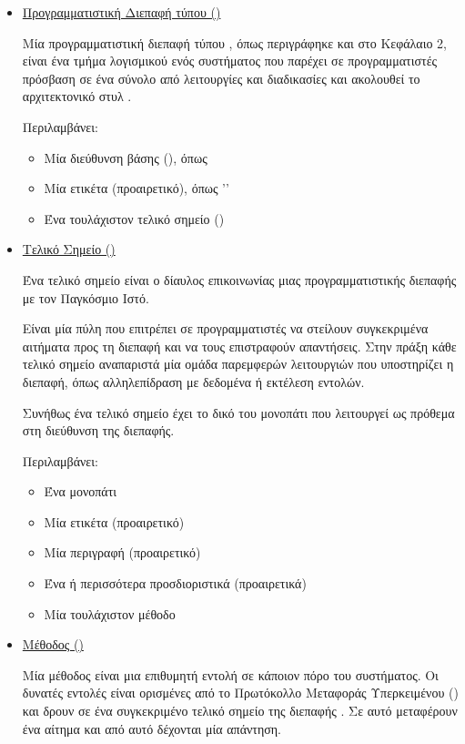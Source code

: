 \begin{itemize}
    \item \underline{Προγραμματιστική Διεπαφή τύπου  ()}
    
    Μία προγραμματιστική διεπαφή τύπου ,
    όπως περιγράφηκε και στο Κεφάλαιο 2,
    είναι ένα τμήμα λογισμικού ενός συστήματος
    που παρέχει σε προγραμματιστές πρόσβαση σε ένα σύνολο από λειτουργίες και διαδικασίες
    και ακολουθεί το αρχιτεκτονικό στυλ .

    Περιλαμβάνει:
    \begin{itemize}
        \item Μία διεύθυνση βάσης (), όπως 
        \item Μία ετικέτα (προαιρετικό), όπως ''
        \item Ένα τουλάχιστον τελικό σημείο ()
    \end{itemize}

    
\item \underline{Τελικό Σημείο ()}

Ένα τελικό σημείο είναι ο δίαυλος επικοινωνίας μιας προγραμματιστικής διεπαφής με τον Παγκόσμιο Ιστό.

Είναι μία πύλη που επιτρέπει σε προγραμματιστές να στείλουν συγκεκριμένα αιτήματα προς τη διεπαφή και να τους επιστραφούν απαντήσεις.
Στην πράξη κάθε τελικό σημείο αναπαριστά μία ομάδα παρεμφερών λειτουργιών που υποστηρίζει η διεπαφή,
όπως αλληλεπίδραση με δεδομένα ή εκτέλεση εντολών.

Συνήθως ένα τελικό σημείο έχει το δικό του μονοπάτι που λειτουργεί ως πρόθεμα στη διεύθυνση της διεπαφής.

Περιλαμβάνει:
\begin{itemize}
    \item Ένα μονοπάτι
    \item Μία ετικέτα (προαιρετικό)
    \item Μία περιγραφή (προαιρετικό)
    \item Ένα ή περισσότερα προσδιοριστικά (προαιρετικά)
    \item Μία τουλάχιστον μέθοδο
\end{itemize}

\item \underline{Μέθοδος ()}

Μία μέθοδος είναι μια επιθυμητή εντολή σε κάποιον πόρο του συστήματος.
Οι δυνατές εντολές είναι ορισμένες από το Πρωτόκολλο Μεταφοράς Υπερκειμένου () 
και δρουν σε ένα συγκεκριμένο τελικό σημείο της διεπαφής \cite{fielding1999hypertext}.
Σε αυτό μεταφέρουν ένα αίτημα και από αυτό δέχονται μία απάντηση.


\end{itemize}

